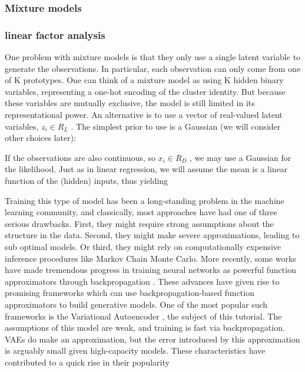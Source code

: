 \subsubsection{Mixture models}



\subsubsection{linear factor analysis}

One problem with mixture models is that they only use a single latent variable to generate the
observations. In particular, each observation can only come from one of K prototypes. One can
think of a mixture model as using K hidden binary variables, representing a one-hot encoding
of the cluster identity. But because these variables are mutually exclusive, the model is still
limited in its representational power.
An alternative is to use a vector of real-valued latent variables, $z_i \in R_L$ . The simplest prior
to use is a Gaussian (we will consider other choices later):


If the observations are also continuous, so $x_i \in R_D$ , we may use a Gaussian for the likelihood.
Just as in linear regression, we will assume the mean is a linear function of the (hidden) inputs,
thus yielding




Training this type of model has been a long-standing problem in the machine learning community, and classically, most approaches have had one of three serious drawbacks. First, they might require strong assumptions about the structure in the data. Second, they might make severe approximations, leading to sub optimal models. Or third, they might rely on computationally expensive inference procedures like Markov Chain Monte Carlo. More recently, some works have made tremendous progress in training neural networks as powerful function approximators through backpropagation \cite{NIPS2012_4824}. These advances have given rise to promising frameworks which can use backpropagation-based function approximators to build generative models. One of the most popular such frameworks is the Variational Autoencoder \cite{}, the subject of this tutorial. The assumptions of this model are weak, and training is fast via backpropagation. VAEs do make an approximation, but the error introduced by this approximation is arguably small given high-capacity models. These characteristics have contributed to a quick rise in their popularity

